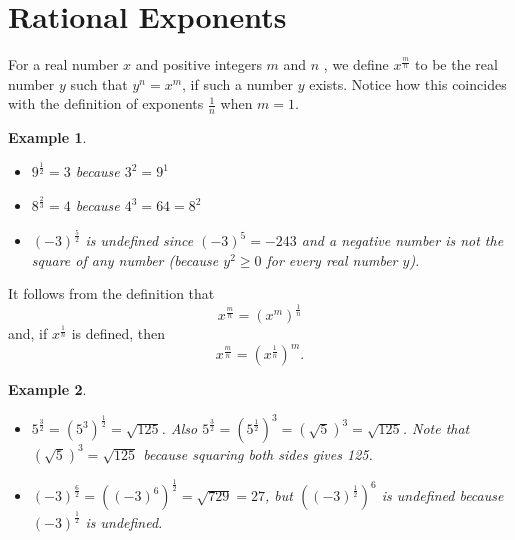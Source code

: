 \documentclass[11pt]{book}               %
\newtheorem{example}{Example}
\begin{document}
%
%

\newpage

\label{section_rational-exponents}
\section{Rational Exponents}

For a real number $x$ and positive integers $m$ and $n$ , we define $x^{\frac{m}{n}}$ to be the real number $y$ such that $y^n = x^m$, if such a number $y$ exists.  Notice how this coincides with the definition of exponents $\frac{1}{n}$ when $m = 1$.

\begin{example}
$ $ \normalfont
\begin{itemize}
\item $9^\frac{1}{2} = 3$ because $3^2 = 9^1$
\item $8^\frac{2}{3} = 4$ because $4^3 = 64 = 8^2$
\item $(-3)^\frac{5}{2}$ is undefined since $(-3)^5 = -243$ and a negative number is not the square of any number (because $y^2 \geq 0$ for every real number $y$).
\end{itemize}
\end{example}


It follows from the definition that 
$$x^\frac{m}{n} = \left(x^m\right)^\frac{1}{n}$$
and, if $x^\frac{1}{n}$ is defined, then 
$$x^\frac{m}{n} = \left(x^\frac{1}{n}\right)^m.$$



\begin{example}
$ $
\normalfont
\begin{itemize}
\item $5^\frac{3}{2} = \left(5^3\right)^\frac{1}{2} = \sqrt{125}$.  Also 
$5^\frac{3}{2} = \left(5^\frac{1}{2}\right)^3 = \left(\sqrt{5}\right)^3 = \sqrt{125}$.  Note that $\left(\sqrt{5}\right)^3 = \sqrt{125}$ because squaring both sides gives 125.

\item $\left(-3\right)^\frac{6}{2} = \left(\left(-3\right)^6\right)^\frac{1}{2} = \sqrt{729} = 27$, but 
 $\left(\left(-3\right)^\frac{1}{2}\right)^6$ is undefined because $\left(-3\right)^\frac{1}{2}$ is undefined.
\end{itemize}
\label{ex2}
\end{example}
\end{document}
